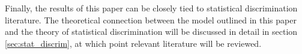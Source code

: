 
Finally, the results of this paper can be closely tied to statistical discrimination literature. 
The theoretical connection between the model outlined in this paper and the theory of statistical discrimination will be discussed in detail in section \ref{sec:stat_discrim}, at which point relevant literature will be reviewed. 


